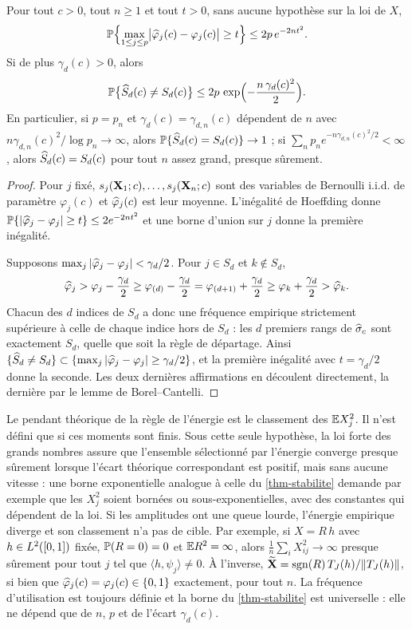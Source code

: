 \begin{theoreme}\label{thm-stabilite}
Pour tout $c>0$, tout $n\ge1$ et tout $t>0$, sans aucune hypothèse sur la loi de $X$,
\[
  \mathbb{P}\Bigl\{\max_{1\le j\le p}\bigl|\widehat{\varphi}_j(c)-\varphi_j(c)\bigr|\ge t\Bigr\}\le2p\,e^{-2nt^2}.
\]
Si de plus $\gamma_d(c)>0$, alors
\[
  \mathbb{P}\bigl\{\widehat{S}_d(c)\neq S_d(c)\bigr\}\le2p\,\exp\Bigl(-\frac{n\,\gamma_d(c)^2}{2}\Bigr).
\]
En particulier, si $p=p_n$ et $\gamma_d(c)=\gamma_{d,n}(c)$ dépendent de $n$ avec $n\gamma_{d,n}(c)^2/\log p_n\to\infty$, alors $\mathbb{P}\{\widehat{S}_d(c)=S_d(c)\}\to1$ ; si $\sum_np_ne^{-n\gamma_{d,n}(c)^2/2}<\infty$, alors $\widehat{S}_d(c)=S_d(c)$ pour tout $n$ assez grand, presque sûrement.
\end{theoreme}

\begin{proof}
Pour $j$ fixé, $s_j(\mathbf{X}_1;c),\dots,s_j(\mathbf{X}_n;c)$ sont des variables de Bernoulli i.i.d. de paramètre $\varphi_j(c)$ et $\widehat{\varphi}_j(c)$ est leur moyenne. L'inégalité de Hoeffding donne $\mathbb{P}\{|\widehat{\varphi}_j-\varphi_j|\ge t\}\le2e^{-2nt^2}$ et une borne d'union sur $j$ donne la première inégalité.

Supposons $\max_j|\widehat{\varphi}_j-\varphi_j|<\gamma_d/2$. Pour $j\in S_d$ et $k\notin S_d$,
\[
  \widehat{\varphi}_j>\varphi_j-\frac{\gamma_d}{2}\ge\varphi_{(d)}-\frac{\gamma_d}{2}=\varphi_{(d+1)}+\frac{\gamma_d}{2}\ge\varphi_k+\frac{\gamma_d}{2}>\widehat{\varphi}_k .
\]
Chacun des $d$ indices de $S_d$ a donc une fréquence empirique strictement supérieure à celle de chaque indice hors de $S_d$ : les $d$ premiers rangs de $\widehat{\sigma}_c$ sont exactement $S_d$, quelle que soit la règle de départage. Ainsi $\{\widehat{S}_d\ne S_d\}\subset\{\max_j|\widehat{\varphi}_j-\varphi_j|\ge\gamma_d/2\}$, et la première inégalité avec $t=\gamma_d/2$ donne la seconde. Les deux dernières affirmations en découlent directement, la dernière par le lemme de Borel--Cantelli.
\end{proof}

\begin{remarque}\label{rem-energie-moments}
Le pendant théorique de la règle de l'énergie est le classement des $\mathbb{E} X_j^2$. Il n'est défini que si ces moments sont finis. Sous cette seule hypothèse, la loi forte des grands nombres assure que l'ensemble sélectionné par l'énergie converge presque sûrement lorsque l'écart théorique correspondant est positif, mais sans aucune vitesse : une borne exponentielle analogue à celle du \cref{thm-stabilite} demande par exemple que les $X_j^2$ soient bornées ou sous-exponentielles, avec des constantes qui dépendent de la loi. Si les amplitudes ont une queue lourde, l'énergie empirique diverge et son classement n'a pas de cible. Par exemple, si $X=R\,h$ avec $h\in L^2([0,1])$ fixée, $\mathbb{P}(R=0)=0$ et $\mathbb{E} R^2=\infty$, alors $\frac1n\sum_iX_{ij}^2\to\infty$ presque sûrement pour tout $j$ tel que $\langle h,\psi_j\rangle\neq0$. À l'inverse, $\widetilde{\mathbf{X}}=\operatorname{sgn}(R)\,T_J(h)/\|T_J(h)\|$, si bien que $\widehat{\varphi}_j(c)=\varphi_j(c)\in\{0,1\}$ exactement, pour tout $n$. La fréquence d'utilisation est toujours définie et la borne du \cref{thm-stabilite} est universelle : elle ne dépend que de $n$, $p$ et de l'écart $\gamma_d(c)$.
\end{remarque}

